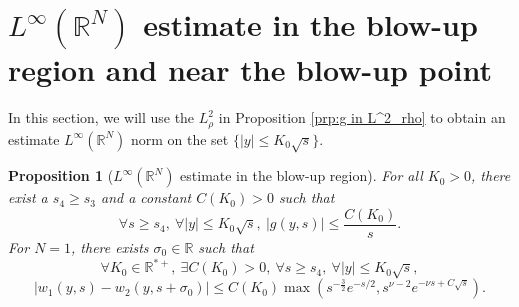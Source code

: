 \documentclass[11pt,a4paper]{article}
\newcommand{\1}{\mathbbm{1}}
\numberwithin{equation}{section}
\newcommand{\numberset}{\mathbb}
\newcommand{\R}{\numberset{R}}
\newtheorem{prp}[lemma]{Proposition}
\theoremstyle{remark}
\begin{document}
\section{$L^\infty(\R^N)$ estimate in the blow-up region and near the blow-up point }\label{L infinity estimate in blow-up region}
In this section, we will use the $L^2_\rho$ in Proposition \ref{prp:g in L^2_rho} to obtain an estimate $L^\infty(\R^N)$ norm on the set $\{|y|\leq K_0\sqrt{s}\}$.
\begin{prp}[$L^\infty(\R^N)$ estimate in the blow-up region]\label{prop:estimation g}
For all $K_0>0$, there exist a $s_4\geq s_3$ and a constant $C(K_0)>0$ such that
$$\forall s\geq s_4,\ \forall |y|\leq K_0\sqrt{s},\ |g(y,s)|\leq \frac{C(K_0)}{s}.$$
For $N=1$, there exists $\sigma_0\in \R$ such that 
$$\forall K_0\in \R^{*+},\ \exists C(K_0)>0,\ \forall s\geq s_4,\ \forall |y|\leq K_0\sqrt{s},$$
$$|w_{1}(y,s)-w_{2}(y,s+\sigma_0)|\leq C(K_0)\max \left(s^{-\frac{3}{2}}e^{-s/2},s^{\nu-2}e^{-\nu s+C\sqrt{s}}\right).$$
\end{prp}
\end{document}
